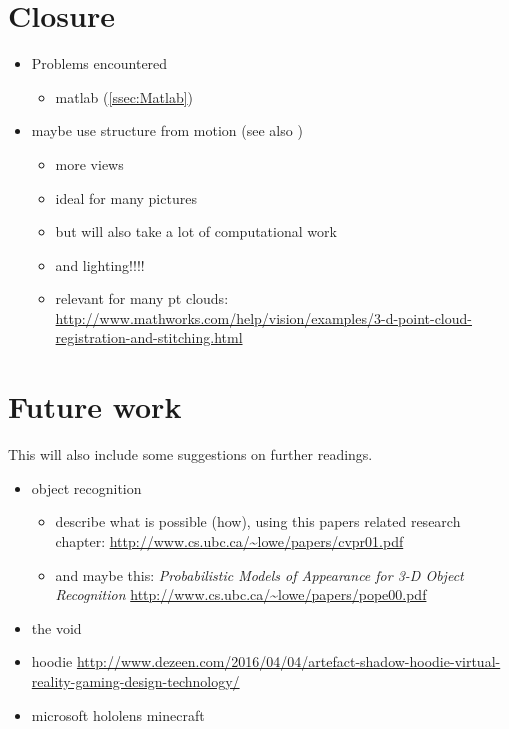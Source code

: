 \section{Closure}
\begin{itemize}
\item Problems encountered
	\begin{itemize}
	\item matlab (\autoref{ssec:Matlab})
	\end{itemize}
\item maybe use structure from motion (see also \cite{Gordon.2004})
	\begin{itemize}
	\item more views
	\item ideal for many pictures
	\item but will also take a lot of computational work
	\item and lighting!!!!
	\item relevant for many pt clouds: \url{http://www.mathworks.com/help/vision/examples/3-d-point-cloud-registration-and-stitching.html}
	\end{itemize}
\end{itemize}


\section{Future work}\label{sec:Future}
This will also include some suggestions on further readings.

\begin{itemize}
\item object recognition
	\begin{itemize}
	\item describe what is possible (how), using this papers related research chapter: \cite{Lowe.2001} \url{http://www.cs.ubc.ca/~lowe/papers/cvpr01.pdf}
	\item and maybe this: \textit{Probabilistic Models of Appearance for 3-D Object Recognition} \cite{Pope.2000} \url{http://www.cs.ubc.ca/~lowe/papers/pope00.pdf}
	\end{itemize}
\item the void
\item hoodie \url{http://www.dezeen.com/2016/04/04/artefact-shadow-hoodie-virtual-reality-gaming-design-technology/}
\item microsoft hololens minecraft
	
\end{itemize}
